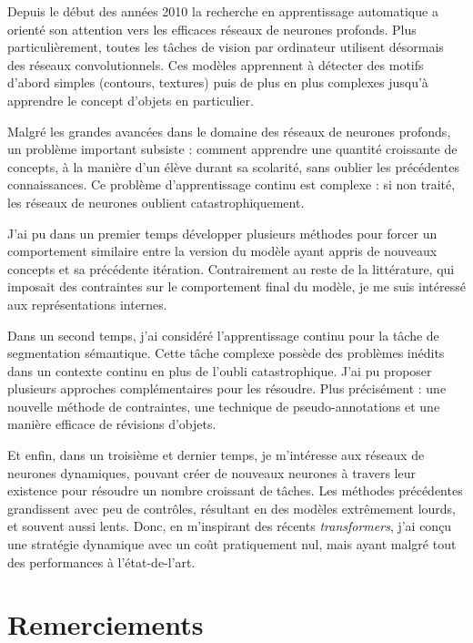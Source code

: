 
Depuis le début des années 2010 la recherche en apprentissage automatique a orienté son attention
vers les efficaces réseaux de neurones profonds. Plus particulièrement, toutes les tâches de vision
par ordinateur utilisent désormais des réseaux convolutionnels. Ces modèles apprennent à détecter
des motifs d'abord simples (contours, textures) puis de plus en plus complexes jusqu'à apprendre
le concept d'objets en particulier.

Malgré les grandes avancées dans le domaine des réseaux de neurones profonds, un problème important
subsiste : comment apprendre une quantité croissante de concepts, à la manière d'un élève durant sa
scolarité, sans oublier les précédentes connaissances. Ce problème d'apprentissage continu est
complexe : si non traité, les réseaux de neurones oublient catastrophiquement.

J'ai pu dans un premier temps développer plusieurs méthodes pour forcer un comportement similaire
entre la version du modèle ayant appris de nouveaux concepts et sa précédente itération.
Contrairement au reste de la littérature, qui imposait des contraintes sur le comportement final du
modèle, je me suis intéressé aux représentations internes.

Dans un second temps, j'ai considéré l'apprentissage continu pour la tâche de segmentation
sémantique. Cette tâche complexe possède des problèmes inédits dans un contexte continu en plus de
l'oubli catastrophique. J'ai pu proposer plusieurs approches complémentaires pour les résoudre. Plus
précisément : une nouvelle méthode de contraintes, une technique de pseudo-annotations et une
manière efficace de révisions d'objets.

Et enfin, dans un troisième et dernier temps, je m'intéresse aux réseaux de neurones dynamiques,
pouvant créer de nouveaux neurones à travers leur existence pour résoudre un nombre croissant de
tâches. Les méthodes précédentes grandissent avec peu de contrôles, résultant en des modèles
extrêmement lourds, et souvent aussi lents. Donc, en m'inspirant des récents \textit{transformers},
j'ai conçu une stratégie dynamique avec un coût pratiquement nul, mais ayant malgré tout des
performances à l'état-de-l'art.


\cleardoublepage
\chapter{Remerciements}

